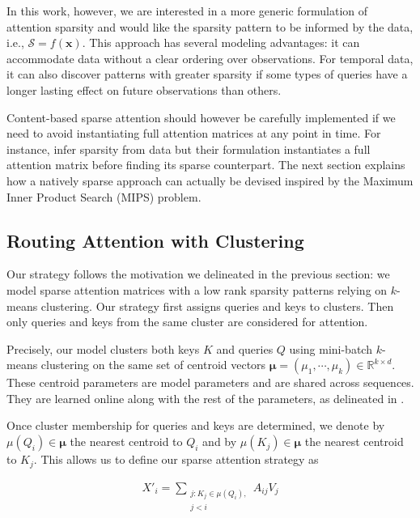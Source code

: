 In this work, however, we are interested in a more generic formulation of attention sparsity and would like the sparsity pattern to be informed by the data, i.e., \(\mathcal{S} = f(\mathbf{x})\). 
This approach has several modeling advantages: it can accommodate data without a clear ordering over observations. For temporal data, it can also discover patterns with greater sparsity if some types of queries have a longer lasting effect on future observations than others.

Content-based sparse attention should however be carefully implemented if we need to avoid instantiating full attention matrices at any point in time. For instance, \citet{correia2019adaptively} infer sparsity from data but their formulation instantiates a full attention matrix before finding its sparse counterpart. The next section explains how a natively sparse approach can actually be devised inspired by the Maximum Inner Product Search (MIPS) problem.

\subsection{Routing Attention with Clustering}\label{sec:routing}
Our strategy follows the motivation we delineated in the previous section: we model sparse attention matrices with a low rank sparsity patterns relying on \(k\)-means clustering. Our strategy first assigns queries and keys to clusters. Then only queries and keys from the same cluster are considered for attention.

Precisely, our model clusters both keys \(K\) and queries \(Q\) using mini-batch \(k\)-means clustering on the same set of centroid vectors 
$\bm{\mu} = (\mu_1, \cdots, \mu_k) \in \mathbb{R}^{k \times d}$. These centroid parameters are model parameters and are shared across sequences. They are learned online along with the rest of the parameters, as delineated in \cite{bottou1995convergence}. 

Once cluster membership for queries and keys are determined, we denote by \(\mu(Q_i)\in \bm{\mu}\) the nearest centroid to \(Q_i\) and by \(\mu(K_j) \in \bm{\mu}\) the nearest centroid to \(K_j\).
This allows us to define our sparse attention strategy as

\begin{align}\label{eq:high-res}
    X'_i = \sum_{\substack{j: K_j \in \mu(Q_i),\\ j <i}} A_{ij}V_j
\end{align}

